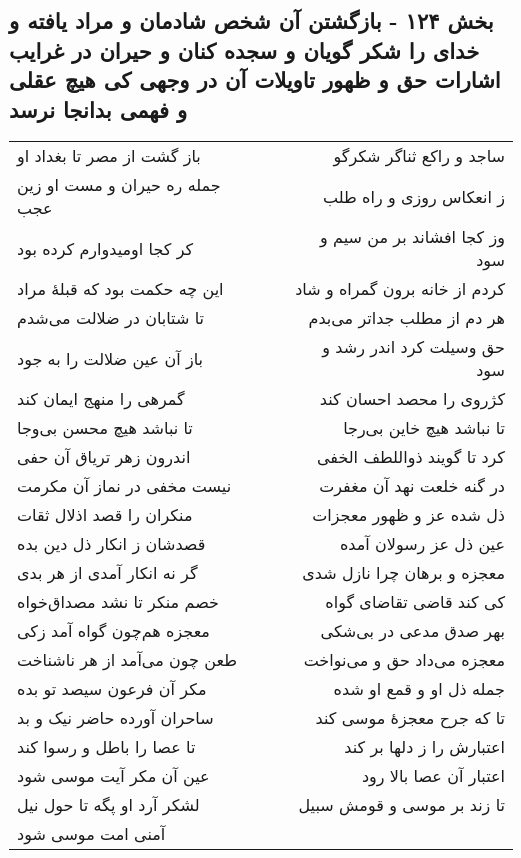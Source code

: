\begin{center}
\section*{بخش ۱۲۴ - بازگشتن آن شخص شادمان و مراد یافته و خدای را شکر گویان و سجده کنان و حیران در غرایب اشارات حق و ظهور تاویلات آن در  وجهی کی هیچ عقلی و فهمی بدانجا نرسد}
\label{sec:sh124}
\begin{longtable}{l p{0.5cm} r}
باز گشت از مصر تا بغداد او
&&
ساجد و راکع ثناگر شکرگو
\\
جمله ره حیران و مست او زین عجب
&&
ز انعکاس روزی و راه طلب
\\
کر کجا اومیدوارم کرده بود
&&
وز کجا افشاند بر من سیم و سود
\\
این چه حکمت بود که قبلهٔ مراد
&&
کردم از خانه برون گمراه و شاد
\\
تا شتابان در ضلالت می‌شدم
&&
هر دم از مطلب جداتر می‌بدم
\\
باز آن عین ضلالت را به جود
&&
حق وسیلت کرد اندر رشد و سود
\\
گمرهی را منهج ایمان کند
&&
کژروی را محصد احسان کند
\\
تا نباشد هیچ محسن بی‌وجا
&&
تا نباشد هیچ خاین بی‌رجا
\\
اندرون زهر تریاق آن حفی
&&
کرد تا گویند ذواللطف الخفی
\\
نیست مخفی در نماز آن مکرمت
&&
در گنه خلعت نهد آن مغفرت
\\
منکران را قصد اذلال ثقات
&&
ذل شده عز و ظهور معجزات
\\
قصدشان ز انکار ذل دین بده
&&
عین ذل عز رسولان آمده
\\
گر نه انکار آمدی از هر بدی
&&
معجزه و برهان چرا نازل شدی
\\
خصم منکر تا نشد مصداق‌خواه
&&
کی کند قاضی تقاضای گواه
\\
معجزه هم‌چون گواه آمد زکی
&&
بهر صدق مدعی در بی‌شکی
\\
طعن چون می‌آمد از هر ناشناخت
&&
معجزه می‌داد حق و می‌نواخت
\\
مکر آن فرعون سیصد تو بده
&&
جمله ذل او و قمع او شده
\\
ساحران آورده حاضر نیک و بد
&&
تا که جرح معجزهٔ موسی کند
\\
تا عصا را باطل و رسوا کند
&&
اعتبارش را ز دلها بر کند
\\
عین آن مکر آیت موسی شود
&&
اعتبار آن عصا بالا رود
\\
لشکر آرد او پگه تا حول نیل
&&
تا زند بر موسی و قومش سبیل
\\
آمنی امت موسی شود

\end{longtable}
\end{center}
